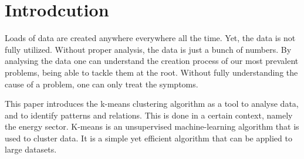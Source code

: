 \chapter{Introdcution}
\label{cha:introduction}




Loads of data are created anywhere everywhere all the time.
Yet, the data is not fully utilized.
Without proper analysis, the data is just a bunch of numbers.
By analysing the data one can understand the creation process of our most prevalent problems, being able to tackle them at the root.
Without fully understanding the cause of a problem, one can only treat the symptoms.

This paper introduces the k-means clustering algorithm as a tool to analyse data, and to identify patterns and relations.
This is done in a certain context, namely the energy sector.
K-means is an unsupervised machine-learning algorithm that is used to cluster data.
It is a simple yet efficient algorithm that can be applied to large datasets.

